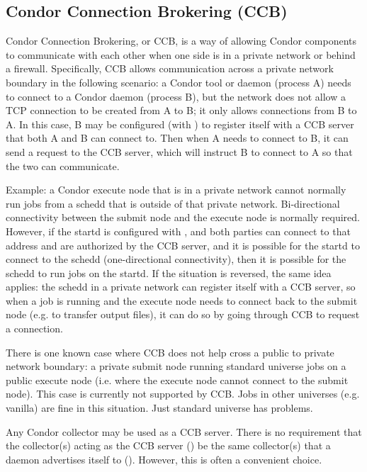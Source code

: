 \subsection{\label{sec:CCB}Condor Connection Brokering (CCB)}

Condor Connection Brokering, or CCB, is a way of allowing Condor
components to communicate with each other when one side is in a
private network or behind a firewall.  Specifically, CCB allows
communication across a private network boundary in the following
scenario: a Condor tool or daemon (process A) needs to connect to a
Condor daemon (process B), but the network does not allow a TCP
connection to be created from A to B; it only allows connections from
B to A.  In this case, B may be configured (with )
to register itself with a CCB server that both A and B can connect to.
Then when A needs to connect to B, it can send a request to the CCB
server, which will instruct B to connect to A so that the two can
communicate.

Example: a Condor execute node that is in a private network cannot
normally run jobs from a schedd that is outside of that private
network.  Bi-directional connectivity between the submit node and the
execute node is normally required.  However, if the startd is
configured with , and both parties can connect
to that address and are authorized by the CCB server, and it is
possible for the startd to connect to the schedd (one-directional
connectivity), then it is possible for the schedd to run jobs on the
startd.  If the situation is reversed, the same idea applies: the
schedd in a private network can register itself with a CCB server, so
when a job is running and the execute node needs to connect back to
the submit node (e.g. to transfer output files), it can do so by going
through CCB to request a connection.

There is one known case where CCB does not help cross a public to
private network boundary: a private submit node running standard
universe jobs on a public execute node (i.e. where the execute node
cannot connect to the submit node).  This case is currently not
supported by CCB.  Jobs in other universes (e.g. vanilla) are fine in
this situation.  Just standard universe has problems.

Any Condor collector may be used as a CCB server.  There is no
requirement that the collector(s) acting as the CCB server
() be the same collector(s) that a daemon
advertises itself to ().  However, this is
often a convenient choice.

